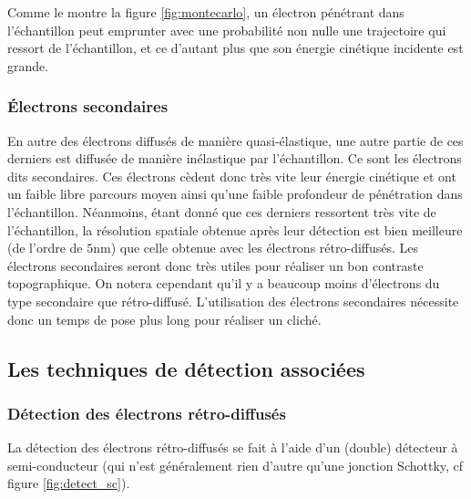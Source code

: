 \documentclass[a4paper,12pt]{article}
\begin{document}
Comme le montre la figure \ref{fig:montecarlo}, un électron pénétrant dans l'échantillon peut emprunter
 avec une probabilité non nulle une trajectoire qui
  ressort de l'échantillon, et ce d'autant plus que son énergie cinétique incidente est grande.

\subsubsection*{Électrons secondaires}
En autre des électrons diffusés de manière quasi-élastique, une autre partie de ces derniers est diffusée de manière inélastique par l'échantillon.
Ce sont les électrons dits secondaires. 
Ces électrons cèdent donc très vite leur énergie cinétique et ont un faible libre parcours moyen ainsi qu'une faible profondeur de pénétration dans l'échantillon. 
Néanmoins, étant donné que ces derniers ressortent très vite de l'échantillon, la résolution spatiale obtenue 
après leur détection est bien meilleure (de l'ordre de $5$nm) que celle obtenue avec les électrons rétro-diffusés.
Les électrons secondaires seront donc très utiles pour réaliser un bon contraste topographique.
On notera cependant qu'il y a beaucoup moins d'électrons du type secondaire que rétro-diffusé. 
L'utilisation des électrons secondaires nécessite donc un temps de pose plus long pour réaliser un cliché.

\subsection{Les techniques de détection associées}

\subsubsection*{Détection des électrons rétro-diffusés}

La détection des électrons rétro-diffusés se fait à l'aide d'un (double) détecteur à semi-conducteur 
(qui n'est généralement rien d'autre qu'une jonction Schottky, cf figure \ref{fig:detect_sc}). 
\end{document}
